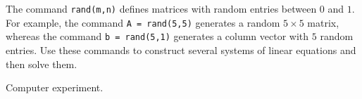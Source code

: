 \documentclass{ximera}
\begin{document}
\begin{computerExercise} \label{c2.1.6}
The \Matlab command {\tt rand(m,n)} defines
matrices with random
entries between $0$ and $1$.  For example, the command {\tt A =
rand(5,5)} generates a random $5\times 5$ matrix, whereas the
command {\tt b = rand(5,1)} generates a column vector with $5$
random entries.  Use these commands to construct several systems
of linear equations and then solve them.

\begin{solution}
Computer experiment.

\end{solution}
\end{computerExercise}
\end{document}
